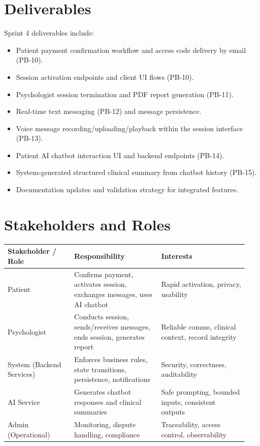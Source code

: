 \documentclass[12pt]{article}
\begin{document}
\section{Deliverables}
Sprint 4 deliverables include:
\begin{itemize}[leftmargin=*]
  \item Patient payment confirmation workflow and access code delivery by email (PB-10).
  \item Session activation endpoints and client UI flows (PB-10).
  \item Psychologist session termination and PDF report generation (PB-11).
  \item Real-time text messaging (PB-12) and message persistence.
  \item Voice message recording/uploading/playback within the session interface (PB-13).
  \item Patient AI chatbot interaction UI and backend endpoints (PB-14).
  \item System-generated structured clinical summary from chatbot history (PB-15).
  \item Documentation updates and validation strategy for integrated features.
\end{itemize}

\section{Stakeholders and Roles}
\begin{longtable}{L{0.26\linewidth} L{0.34\linewidth} L{0.34\linewidth}}
\toprule
\textbf{Stakeholder / Role} & \textbf{Responsibility} & \textbf{Interests} \\
\midrule
\endhead
Patient & Confirms payment, activates session, exchanges messages, uses AI chatbot & Rapid activation, privacy, usability \\
Psychologist & Conducts session, sends/receives messages, ends session, generates report & Reliable comms, clinical context, record integrity \\
System (Backend Services) & Enforces business rules, state transitions, persistence, notifications & Security, correctness, auditability \\
AI Service & Generates chatbot responses and clinical summaries & Safe prompting, bounded inputs, consistent outputs \\
Admin (Operational) & Monitoring, dispute handling, compliance & Traceability, access control, observability \\
\bottomrule
\end{longtable}
\end{document}
